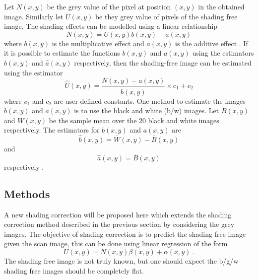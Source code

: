 \documentclass[a4paper]{proc}
\begin{document}
Let $N(x,y)$ be the grey value of the pixel at position $(x,y)$ in the obtained image. Similarly let $U(x,y)$ be they grey value of pixels of the shading free image. The shading effects can be modelled using a linear relationship
\begin{equation}
N(x,y) = U(x,y)b(x,y) + a(x,y)
\end{equation} 
where $b(x,y)$ is the multiplicative effect and $a(x,y)$ is the additive effect \cite{munzenmayer2003enhancing}. If it is possible to estimate the functions $b(x,y)$ and $a(x,y)$ using the estimators $\widehat{b}(x,y)$ and $\widehat{a}(x,y)$ respectively, then the shading-free image can be estimated using the estimator
\begin{equation}
\widehat{U}(x,y) = \frac{N(x,y)-\widehat{a}(x,y)}{\widehat{b}(x,y)} \times c_1 + c_2
\end{equation}
where $c_1$ and $c_2$ are user defined constants.
One method to estimate the images $b(x,y)$ and $a(x,y)$ is to use the black and white (b/w) images. Let $\overline{B}(x,y)$ and $\overline{W}(x,y)$ be the sample mean over the 20 black and white images respectively. The estimators for $b(x,y)$ and $a(x,y)$ are
\begin{equation}
\widehat{b}(x,y) = \overline{W}(x,y) - \overline{B}(x,y)
\end{equation}
and
\begin{equation}
\widehat{a}(x,y) = \overline{B}(x,y)
\end{equation}
respectively \cite{young2000shading}.

\subsection{Methods}
A new shading correction will be proposed here which extends the shading correction method described in the previous section by considering the grey images. The objective of shading correction is to predict the shading free image given the scan image, this can be done using linear regression of the form
\begin{equation}
U(x,y) = N(x,y)\beta(x,y)+\alpha(x,y) \ .
\end{equation}
The shading free image is not truly known, but one should expect the b/g/w shading free images should be completely flat.
\end{document}

